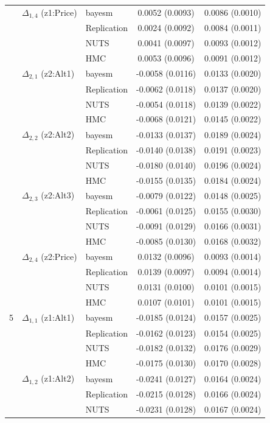 \begin{longtable}{cllcc}
 & $\Delta_{1,4}$ (z1:Price) & bayesm & 0.0052 (0.0093) & 0.0086 (0.0010) \\
 &  & Replication & 0.0024 (0.0092) & 0.0084 (0.0011) \\
 &  & NUTS & 0.0041 (0.0097) & 0.0093 (0.0012) \\
 &  & HMC & 0.0053 (0.0096) & 0.0091 (0.0012) \\
 & $\Delta_{2,1}$ (z2:Alt1) & bayesm & -0.0058 (0.0116) & 0.0133 (0.0020) \\
 &  & Replication & -0.0062 (0.0118) & 0.0137 (0.0020) \\
 &  & NUTS & -0.0054 (0.0118) & 0.0139 (0.0022) \\
 &  & HMC & -0.0068 (0.0121) & 0.0145 (0.0022) \\
 & $\Delta_{2,2}$ (z2:Alt2) & bayesm & -0.0133 (0.0137) & 0.0189 (0.0024) \\
 &  & Replication & -0.0140 (0.0138) & 0.0191 (0.0023) \\
 &  & NUTS & -0.0180 (0.0140) & 0.0196 (0.0024) \\
 &  & HMC & -0.0155 (0.0135) & 0.0184 (0.0024) \\
 & $\Delta_{2,3}$ (z2:Alt3) & bayesm & -0.0079 (0.0122) & 0.0148 (0.0025) \\
 &  & Replication & -0.0061 (0.0125) & 0.0155 (0.0030) \\
 &  & NUTS & -0.0091 (0.0129) & 0.0166 (0.0031) \\
 &  & HMC & -0.0085 (0.0130) & 0.0168 (0.0032) \\
 & $\Delta_{2,4}$ (z2:Price) & bayesm & 0.0132 (0.0096) & 0.0093 (0.0014) \\
 &  & Replication & 0.0139 (0.0097) & 0.0094 (0.0014) \\
 &  & NUTS & 0.0131 (0.0100) & 0.0101 (0.0015) \\
 &  & HMC & 0.0107 (0.0101) & 0.0101 (0.0015) \\
5 & $\Delta_{1,1}$ (z1:Alt1) & bayesm & -0.0185 (0.0124) & 0.0157 (0.0025) \\
 &  & Replication & -0.0162 (0.0123) & 0.0154 (0.0025) \\
 &  & NUTS & -0.0182 (0.0132) & 0.0176 (0.0029) \\
 &  & HMC & -0.0175 (0.0130) & 0.0170 (0.0028) \\
 & $\Delta_{1,2}$ (z1:Alt2) & bayesm & -0.0241 (0.0127) & 0.0164 (0.0024) \\
 &  & Replication & -0.0215 (0.0128) & 0.0166 (0.0024) \\
 &  & NUTS & -0.0231 (0.0128) & 0.0167 (0.0024) \\

\end{longtable}
